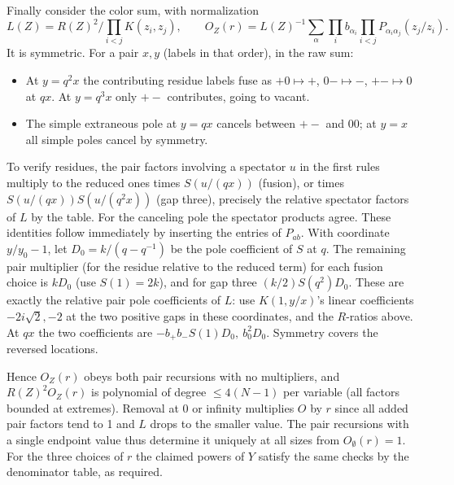 Finally consider the color sum, with normalization
\[
 L(Z)=R(Z)^2/\prod_{i<j}K(z_i,z_j),\qquad O_Z(r)=L(Z)^{-1}\sum_\alpha\prod_i b_{\alpha_i}\prod_{i<j}P_{\alpha_i\alpha_j}(z_j/z_i).
\]
It is symmetric. For a pair \(x,y\) (labels in that order), in the raw sum:
\begin{itemize}
\item At \(y=q^2x\) the contributing residue labels fuse as \(+0\mapsto+\), \(0-\mapsto-\), \(+-\mapsto0\) at \(qx\). At \(y=q^3x\) only \(+-\) contributes, going to vacant.
\item The simple extraneous pole at \(y=qx\) cancels between \(+-\) and \(00\); at \(y=x\) all simple poles cancel by symmetry.
\end{itemize}

To verify residues, the pair factors involving a spectator \(u\) in the first rules multiply to the reduced ones times \(S(u/(qx))\) (fusion), or times \(S(u/(qx))S(u/(q^2x))\) (gap three), precisely the relative spectator factors of \(L\) by the table. For the canceling pole the spectator products agree. These identities follow immediately by inserting the entries of \(P_{ab}\). With coordinate \(y/y_0-1\), let \(D_0=k/(q-q^{-1})\) be the pole coefficient of \(S\) at \(q\). The remaining pair multiplier (for the residue relative to the reduced term) for each fusion choice is \(k D_0\) (use \(S(1)=2k\)), and for gap three \((k/2)S(q^2)D_0\). These are exactly the relative pair pole coefficients of \(L\): use \(K(1,y/x)\)'s linear coefficients \(-2i\sqrt2,-2\) at the two positive gaps in these coordinates, and the \(R\)-ratios above. At \(qx\) the two coefficients are \(-b_+b_- S(1)D_0,\ b_0^2D_0\). Symmetry covers the reversed locations.

Hence \(O_Z(r)\) obeys both pair recursions with no multipliers, and \(R(Z)^2 O_Z(r)\) is polynomial of degree \(\le4(N-1)\) per variable (all factors bounded at extremes). Removal at 0 or infinity multiplies \(O\) by \(r\) since all added pair factors tend to 1 and \(L\) drops to the smaller value. The pair recursions with a single endpoint value thus determine it uniquely at all sizes from \(O_\emptyset(r)=1\). For the three choices of \(r\) the claimed powers of \(Y\) satisfy the same checks by the denominator table, as required.

